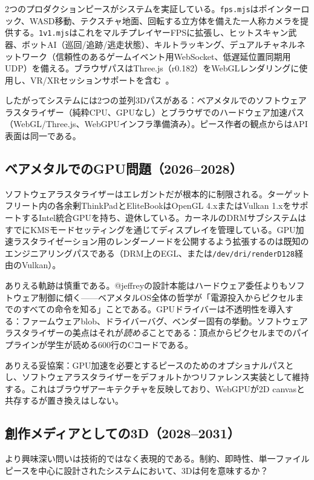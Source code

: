 \documentclass[10pt,letterpaper,twocolumn]{article}
\begin{document}
2つのプロダクションピースがシステムを実証している。\texttt{fps.mjs}はポインターロック、WASD移動、テクスチャ地面、回転する立方体を備えた一人称カメラを提供する。\texttt{1v1.mjs}はこれをマルチプレイヤーFPSに拡張し、ヒットスキャン武器、ボットAI（巡回/追跡/逃走状態）、キルトラッキング、デュアルチャネルネットワーク（信頼性のあるゲームイベント用WebSocket、低遅延位置同期用UDP）を備える。ブラウザパスはThree.js（r0.182）をWebGLレンダリングに使用し、VR/XRセッションサポートを含む~\citep{sutherland1968head}。

したがってシステムには2つの並列3Dパスがある：ベアメタルでのソフトウェアラスタライザー（純粋CPU、GPUなし）とブラウザでのハードウェア加速パス（WebGL/Three.js、WebGPUインフラ準備済み）。ピース作者の観点からはAPI表面は同一である。

\subsection{ベアメタルでのGPU問題（2026--2028）}

ソフトウェアラスタライザーはエレガントだが根本的に制限される。ターゲットフリート内の各余剰ThinkPadとEliteBookはOpenGL 4.xまたはVulkan 1.xをサポートするIntel統合GPUを持ち、遊休している。カーネルのDRMサブシステムはすでにKMSモードセッティングを通じてディスプレイを管理している。GPU加速ラスタライゼーション用のレンダーノードを公開するよう拡張するのは既知のエンジニアリングパスである（DRM上のEGL、または\texttt{/dev/dri/renderD128}経由のVulkan）。

ありえる軌跡は慎重である。@jeffreyの設計本能はハードウェア委任よりもソフトウェア制御に傾く——ベアメタルOS全体の哲学が「電源投入からピクセルまでのすべての命令を知る」ことである。GPUドライバーは不透明性を導入する：ファームウェアblob、ドライバーバグ、ベンダー固有の挙動。ソフトウェアラスタライザーの美点はそれが\emph{読める}ことである：頂点からピクセルまでのパイプラインが学生が読める600行のCコードである。

ありえる妥協案：GPU加速を必要とするピースのためのオプショナルパスとし、ソフトウェアラスタライザーをデフォルトかつリファレンス実装として維持する。これはブラウザアーキテクチャを反映しており、WebGPUが2D canvasと共存するが置き換えはしない。

\subsection{創作メディアとしての3D（2028--2031）}

より興味深い問いは技術的ではなく表現的である。制約、即時性、単一ファイルピースを中心に設計されたシステムにおいて、3Dは何を意味するか？
\end{document}
